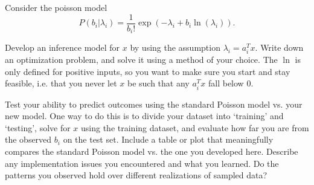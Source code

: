 \documentclass[10pt]{article}
\begin{document}
\clearpage
\begin{problem}[Bonus]
Consider the poisson model 
\[
P(b_i | \lambda_i) = \frac{1}{b_i!} \exp(-\lambda_i + b_i \ln(\lambda_i)).
\]

Develop an inference model for \( x \) by using the assumption \( \lambda_i = a_i^T x \). Write down an optimization problem, and 
solve it using a method of your choice. The \( \ln \) is only defined for positive inputs, so you want to make sure you start and 
stay feasible, i.e. that you never let \( x \) be such that any \( a_i^T x \) fall below \( 0 \).

Test your ability to predict outcomes  using  the standard Poisson model vs. your new model. 
One way to do this is to divide your dataset into `training' and `testing', solve for \( x \) using the training dataset, and evaluate how far you are
from the observed \( b_i \) on the test set. Include a table or plot that meaningfully compares the standard Poisson model vs. the one you developed here. 
Describe any implementation issues you encountered and what you learned. Do the patterns you observed hold over different realizations of sampled data? 
\end{problem}

\begin{solution}[Solution]
\end{solution}
\end{document}
